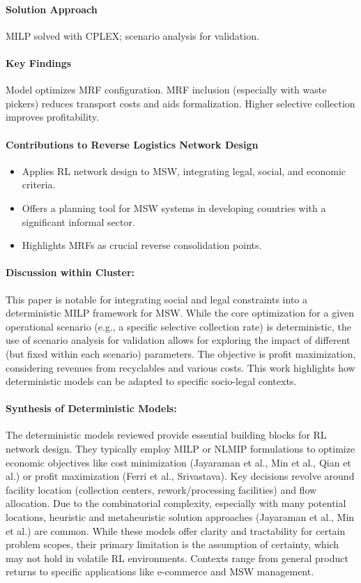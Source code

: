 \paragraph{Solution Approach} MILP solved with CPLEX; scenario analysis for validation.
\paragraph{Key Findings} Model optimizes MRF configuration. MRF inclusion (especially with waste pickers) reduces transport costs and aids formalization. Higher selective collection improves profitability.
\paragraph{Contributions to Reverse Logistics Network Design}
\begin{itemize}
    \item Applies RL network design to MSW, integrating legal, social, and economic criteria.
    \item Offers a planning tool for MSW systems in developing countries with a significant informal sector.
    \item Highlights MRFs as crucial reverse consolidation points.
\end{itemize}
\paragraph{Discussion within Cluster:} This paper is notable for integrating social and legal constraints into a deterministic MILP framework for MSW. While the core optimization for a given operational scenario (e.g., a specific selective collection rate) is deterministic, the use of scenario analysis for validation allows for exploring the impact of different (but fixed within each scenario) parameters. The objective is profit maximization, considering revenues from recyclables and various costs. This work highlights how deterministic models can be adapted to specific socio-legal contexts.

\paragraph{Synthesis of Deterministic Models:}
The deterministic models reviewed provide essential building blocks for RL network design. They typically employ MILP or NLMIP formulations to optimize economic objectives like cost minimization (Jayaraman et al., Min et al., Qian et al.) or profit maximization (Ferri et al., Srivastava). Key decisions revolve around facility location (collection centers, rework/processing facilities) and flow allocation. Due to the combinatorial complexity, especially with many potential locations, heuristic and metaheuristic solution approaches (Jayaraman et al., Min et al.) are common. While these models offer clarity and tractability for certain problem scopes, their primary limitation is the assumption of certainty, which may not hold in volatile RL environments. Contexts range from general product returns to specific applications like e-commerce and MSW management.

